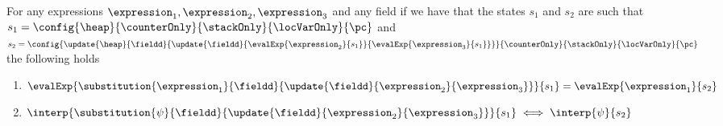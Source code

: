 \begin{enumerate}
\end{enumerate}

\begin{substHeap}\label{substHeap}
For any expressions $ \expression_1, \expression_2, \expression_3 $ and any field \fieldd
if we have that the states $s_1$ and $s_2$ are such that
 $s_1 =   \config{\heap}{\counterOnly}{ \stackOnly }{\locVarOnly}{\pc }$ and \\
  $s_2 =  \config{ \update{\heap}{\fieldd }{\update{\fieldd}
                                                   {\evalExp{\expression_2}{ s_1 } }
                                                   {\evalExp{ \expression_3}{ s_1 } } } }
                                          {\counterOnly}{ \stackOnly }{\locVarOnly}{\pc }   $  the following holds
\begin{enumerate}
  \item $ \evalExp{\substitution{\expression_1}{\fieldd}{ \update{ \fieldd  }{\expression_2}{\expression_3} }}{ s_1 } =  \evalExp{\expression_1}{ s_2  }  $
  \item $ \interp{\substitution{\psi}{\fieldd}{ \update{ \fieldd  }{\expression_2}{\expression_3} }}{ s_1 } \iff  \interp{\psi}{ s_2  }  $
\end{enumerate}
\end{substHeap}

